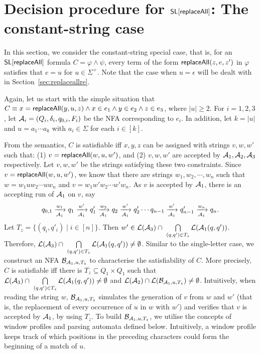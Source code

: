
\section{Decision procedure for $\mathsf{SL}[\mathsf{replaceAll}]$: The constant-string case}\label{sec:replaceallcs}

In this section, we consider the constant-string special case, that is, for an $\mathsf{SL}[\mathsf{replaceAll}]$ formula $C = \varphi \wedge \psi$, every term of the form $\mathsf{replaceAll}(z, e, z')$ in $\varphi$ satisfies that $e=u$ for $u \in \Sigma^+$. Note that the case when $u=\epsilon$ will be dealt with in Section~\ref{sec:replaceallre}. 

Again, let us start with the simple situation that
$C \equiv x = \mathsf{replaceAll}(y, u, z) \wedge x \in e_1 \wedge y \in e_2 \wedge z \in e_3$,
where $|u| \ge 2$. For $i=1,2,3$, let $\mathcal{A}_i = (Q_i, \delta_i, q_{0, i}, F_i)$
be the NFA corresponding to $e_i$. In addition, let $k = |u|$ and $u = a_1 \cdots a_k$ with $a_i \in \Sigma$ for each $i \in [k]$.

From the semantics, $C$ is satisfiable iff $x, y, z$ can be assigned with  strings $v, w, w'$ such that: (1) $v = \mathsf{replaceAll}(w, u, w')$, and (2) $v,w, w'$ are accepted by $\mathcal{A}_1, \mathcal{A}_2, \mathcal{A}_3$ respectively. Let $v, w, w'$ be the strings satisfying these two constraints. Since $v = \mathsf{replaceAll}(w, u, w')$, we know that there are strings $w_1, w_2, \cdots, w_n$ such that $w= w_1 u w_2 \cdots u w_n$ and $v = w_1 w' w_2 \cdots w' w_n$. As $v$ is accepted by $\mathcal{A}_1$, there is an accepting run of $\mathcal{A}_1$ on $v$, say
$$
q_{0,1} \xrightarrow[\mathcal{A}_1]{w_1} q_1 \xrightarrow[\mathcal{A}_1]{w'} q'_1 \xrightarrow[\mathcal{A}_1]{w_2} q_2 \xrightarrow[\mathcal{A}_1]{w'} q'_2 \cdots q_{n-1} \xrightarrow[\mathcal{A}_1]{w'} q'_{n-1} \xrightarrow[\mathcal{A}_1]{w_n} q_n.
$$
Let $T_z = \{(q_i, q'_i) \mid i \in [n]\}$. Then $w' \in \mathcal{L}(\mathcal{A}_3) \cap\ \bigcap \limits_{(q,q') \in T_z} \mathcal{L}(\mathcal{A}_1(q, q'))$. Therefore, $\mathcal{L}(\mathcal{A}_3) \cap\ \bigcap \limits_{(q,q') \in T_z} \mathcal{L}(\mathcal{A}_1(q, q')) \neq \emptyset$. Similar to the single-letter case, we construct an NFA $\mathcal{B}_{\mathcal{A}_1, u, T_z}$ to characterise the satisfiability of $C$.  More precisely, $C$ is satisfiable iff there is $T_z \subseteq Q_1 \times Q_1$ such that $\mathcal{L}(\mathcal{A}_3) \cap\ \bigcap \limits_{(q,q') \in T_z} \mathcal{L}(\mathcal{A}_1(q, q')) \neq \emptyset$ and
$\mathcal{L}(\mathcal{A}_2) \cap \mathcal{L}(\mathcal{B}_{\mathcal{A}_1, u, T_z}) \neq \emptyset$. Intuitively, when reading the string $w$, $\mathcal{B}_{\mathcal{A}_1, u, T_z}$ simulates the generation of $v$ from $w$ and $w'$ (that is, the replacement of  every occurrence of $u$ in $w$ with $w'$) and verifies that $v$ is accepted by $\mathcal{A}_1$, by using $T_z$.
To build $\mathcal{B}_{\mathcal{A}_1, u, T_z}$, we utilise the concepts of window profiles and parsing automata defined below.
Intuitively, a window profile keeps track of which positions in the preceding characters could form the beginning of a match of $u$.
%


